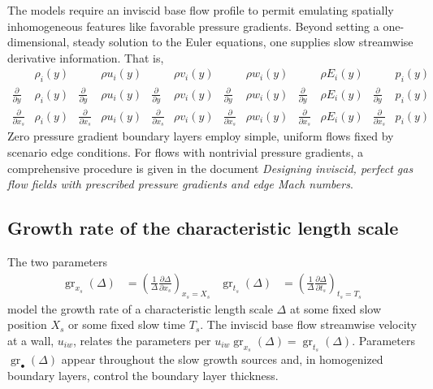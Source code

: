 \documentclass[letterpaper,11pt,nointlimits,reqno,draft]{amsbook}
\begin{document}
The models require an inviscid base flow profile to permit emulating spatially
inhomogeneous features like favorable pressure gradients.  Beyond setting a
one-dimensional, steady solution to the Euler equations, one supplies slow
streamwise derivative information.  That is,
\begin{align}
    &\rho_i\!\left(y\right)                                &  &\rho                                u_i\!\left(y\right)  &  &\rho                                v_i\!\left(y\right)  &  &\rho                                w_i\!\left(y\right)  &  &\rho                                E_i\!\left(y\right)  &  &p_i\!\left(y\right)                                \\
    \frac{\partial}{\partial{}y}&\rho_i\!\left(y\right)    &  \frac{\partial}{\partial{}y}&\rho    u_i\!\left(y\right)  &  \frac{\partial}{\partial{}y}&\rho    v_i\!\left(y\right)  &  \frac{\partial}{\partial{}y}&\rho    w_i\!\left(y\right)  &  \frac{\partial}{\partial{}y}&\rho    E_i\!\left(y\right)  &  \frac{\partial}{\partial{}y}&p_i\!\left(y\right)    \\
    \frac{\partial}{\partial{}x_s}&\rho_i\!\left(y\right)  &  \frac{\partial}{\partial{}x_s}&\rho  u_i\!\left(y\right)  &  \frac{\partial}{\partial{}x_s}&\rho  v_i\!\left(y\right)  &  \frac{\partial}{\partial{}x_s}&\rho  w_i\!\left(y\right)  &  \frac{\partial}{\partial{}x_s}&\rho  E_i\!\left(y\right)  &  \frac{\partial}{\partial{}x_s}&p_i\!\left(y\right)
\end{align}
Zero pressure gradient boundary layers employ simple, uniform flows fixed by
scenario edge conditions.  For flows with nontrivial pressure gradients, a
comprehensive procedure is given in the document \emph{Designing inviscid,
perfect gas flow fields with prescribed pressure gradients and edge Mach
numbers}.

\subsection{Growth rate of the characteristic length scale}
\label{sec:slowgrowthgrdelta}

The two parameters
\begin{align}
    \operatorname{gr}_{x_s}\!\left(\Delta\right) &= \left(
        \frac{1}{\Delta} \frac{\partial\Delta}{\partial x_s}
    \right)_{x_s = X_s}
    &
    \operatorname{gr}_{t_s}\!\left(\Delta\right) &= \left(
        \frac{1}{\Delta} \frac{\partial\Delta}{\partial t_s}
    \right)_{t_s = T_s}
\end{align}
model the growth rate of a characteristic length scale $\Delta$ at some fixed
slow position $X_s$ or some fixed slow time $T_s$.  The inviscid base flow
streamwise velocity at a wall, $u_{iw}$, relates the parameters per
$
    u_{iw}
    \operatorname{gr}_{x_s}\!\left(\Delta\right)
    =
    \operatorname{gr}_{t_s}\!\left(\Delta\right)
$.
Parameters $\operatorname{gr}_{\bullet}\left(\Delta\right)$ appear throughout
the slow growth sources and, in homogenized boundary layers, control the
boundary layer thickness.
\end{document}
